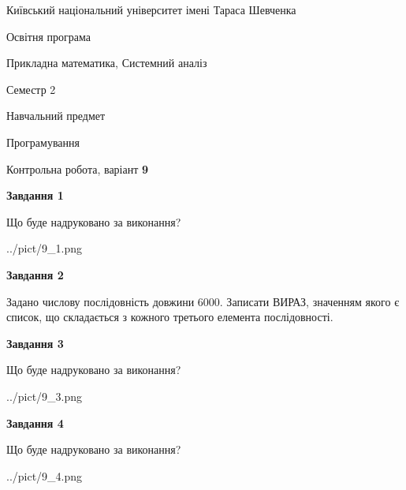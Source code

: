 \documentclass[12pt, ukrainian]{article}
\begin{document}
{{\begin {small}\par
{ \center  Київський національний університет імені Тараса Шевченка \par}
{\parbox {5 cm}{Освітня програма \hfill}{\parbox {8 cm}{Прикладна математика, Системний аналіз \hfill}}\parbox {5 cm}{\hfill Семестр 2}}\par
{\parbox {5 cm} {Навчальний предмет \hfill}\parbox {7 cm}{Програмування \hfill}\parbox {6cm}{\hfill}\par}\vspace{-7pt} \end{small}}{\center Контрольна робота, варіант  \No \textbf
{ 9 }\par}}
{
\begin {large}
{\begin {center}\textbf{Завдання 1}\end {center}}\par
Що буде надруковано за виконання?\par\par
\begin{center}
	{../pict/9_1.png}
\end{center}
\newpage

{\begin {center}\textbf{Завдання 2}\end {center}}\par

 Задано числову послідовність  довжини 6000. Записати ВИРАЗ, значенням якого є список, що складається з кожного третього елемента послідовності.\par
\newpage

{\begin {center}\textbf{Завдання 3}\end {center}}\par
Що буде надруковано за виконання?
\begin{center}
	{../pict/9_3.png}
\end{center}
\newpage

{\begin {center}\textbf{Завдання 4}\end {center}}\par
Що буде надруковано за виконання?\par
\begin{center}
	{../pict/9_4.png}
\end{center}
\newpage


\end{large}}
\end{document}
